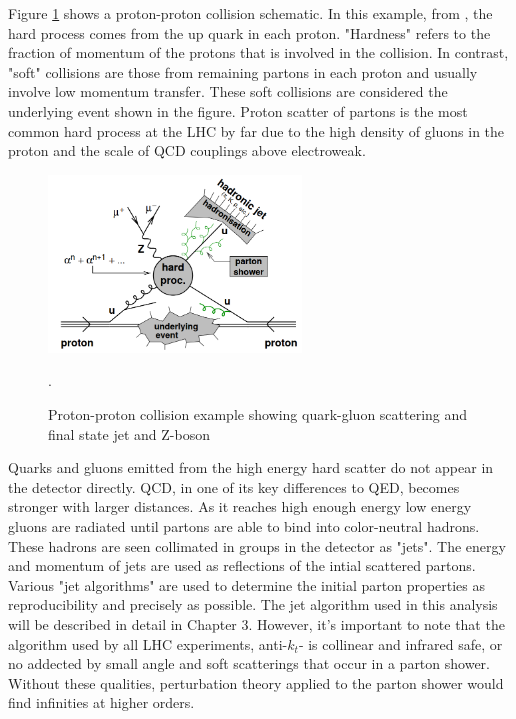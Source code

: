 Figure \ref{fig:protonproton} shows a proton-proton collision schematic. In this example, from \cite{Butterworth}, the hard process comes from the up quark in each proton. "Hardness" refers to the fraction of momentum of the protons that is involved in the collision. In contrast, "soft" collisions are those from remaining partons in each proton and usually involve low momentum transfer. These soft collisions are considered the underlying event shown in the figure. Proton scatter of partons is the most common hard process at the LHC by far due to the high density of gluons in the proton and the scale of QCD couplings above electroweak. 
\begin{figure}[H]
        \centering
    \includegraphics[width=0.6\textwidth] {Pictures/protonproton.png}\hspace{1cm}
    \caption{Proton-proton collision example showing quark-gluon scattering and final state jet and Z-boson \cite{Butterworth}}.
    \label{fig:protonproton}
\end{figure}
Quarks and gluons emitted from the high energy hard scatter do not appear in the detector directly. QCD, in one of its key differences to QED, becomes stronger with larger distances. As it reaches high enough energy low energy gluons are radiated until partons are able to bind into color-neutral hadrons. These hadrons are seen collimated in groups in the detector as "jets". The energy and momentum of jets are used as reflections of the intial scattered partons. Various "jet algorithms" are used to determine the initial parton properties as reproducibility and precisely as possible. The jet algorithm used in this analysis will be described in detail in Chapter 3. However, it's important to note that the algorithm used by all LHC experiments, anti-$k_t$- is collinear and infrared safe, or no addected by small angle and soft scatterings that occur in a parton shower. Without these qualities, perturbation theory applied to the parton shower would find infinities at higher orders.

